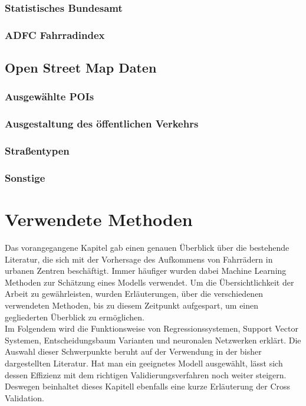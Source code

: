 \documentclass[a4paper,12pt]{thesis}
\begin{document}
\subsection{Statistisches Bundesamt}



\subsection{ADFC Fahrradindex}

\section{Open Street Map Daten}

\subsection{Ausgewählte POIs}
\subsection{Ausgestaltung des öffentlichen Verkehrs}
\subsection{Straßentypen}
\subsection{Sonstige}

\chapter{Verwendete Methoden}

Das vorangegangene Kapitel gab einen genauen Überblick über die bestehende Literatur, die sich mit der Vorhersage des Aufkommens von Fahrrädern in urbanen Zentren beschäftigt. Immer häufiger wurden dabei Machine Learning Methoden zur Schätzung eines Modells verwendet. Um die Übersichtlichkeit der Arbeit zu gewährleisten, wurden Erläuterungen, über die verschiedenen verwendeten Methoden, bis zu diesem Zeitpunkt aufgespart, um einen gegliederten Überblick zu ermöglichen.\\
Im Folgendem wird die Funktionsweise von Regressionssystemen, Support Vector Systemen, Entscheidungsbaum Varianten und neuronalen Netzwerken erklärt. Die Auswahl dieser Schwerpunkte beruht auf der Verwendung in der bisher dargestellten Literatur. Hat man ein geeignetes Modell ausgewählt, lässt sich dessen Effizienz mit dem richtigen Validierungsverfahren noch weiter steigern. Deswegen beinhaltet dieses Kapitell ebenfalls eine kurze Erläuterung der Cross Validation.
\end{document}

